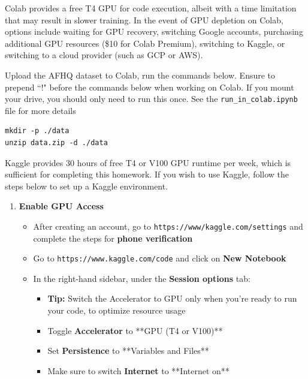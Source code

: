 \documentclass[11pt,addpoints,answers]{exam}
\begin{document}
\begin{questions}
\pagebreak

Colab provides a free T4 GPU for code execution, albeit with a time limitation that may result in slower training. In the event of GPU depletion on Colab, options include waiting for GPU recovery, switching Google accounts, purchasing additional GPU resources (\$10 for Colab Premium), switching to Kaggle, or switching to a cloud provider (such as GCP or AWS).

Upload the AFHQ dataset to Colab, run the commands below. Ensure to prepend ``!" before the commands below when working on Colab. If you mount your drive, you should only need to run this once. See the \lstinline{run_in_colab.ipynb} file for more details

\lstset{breaklines=true}


\begin{lstlisting}
mkdir -p ./data
unzip data.zip -d ./data
\end{lstlisting}


Kaggle provides 30 hours of free T4 or V100 GPU runtime per week, which is sufficient for completing this homework. If you wish to use Kaggle, follow the steps below to set up a Kaggle environment.

\begin{enumerate}
    \item \textbf{Enable GPU Access}
    \begin{itemize}
        \item After creating an account, go to 
        \texttt{https://www/kaggle.com/settings} and complete the steps for \textbf{phone verification}
        \item Go to \texttt{https://www.kaggle.com/code} and click on \textbf{New Notebook}
        \item In the right-hand sidebar, under the \textbf{Session options} tab:
        \begin{itemize}
            \item \textbf{Tip:} Switch the Accelerator to GPU only when you're ready to run your code, to optimize resource usage
            \item Toggle \textbf{Accelerator} to **GPU (T4 or V100)**
            \item Set \textbf{Persistence} to **Variables and Files**
            \item Make sure to switch \textbf{Internet} to **Internet on**
        \end{itemize}
    \end{itemize}


\end{enumerate}
\end{questions}
\end{document}
